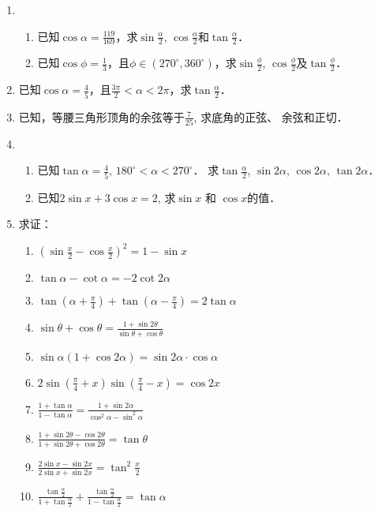 \begin{enumerate}
\item \begin{enumerate}
    \item 已知$\cos\alpha =\frac{119}{169}$，求$\sin\frac{\alpha}{2}$, $\cos\frac{\alpha}{2}$和$\tan\frac{\alpha}{2}$．
    \item 已知$\cos\phi=\frac{1}{3}$，且$\phi\in(270^{\circ}, 360^{\circ})$，求$\sin\frac{\phi}{2}$, $\cos\frac{\phi}{2}$及$\tan\frac{\phi}{2}$．
\end{enumerate}
\item 已知$\cos\alpha=\frac{4}{5}$，且$\frac{3\pi}{2}<\alpha<2\pi$，求$\tan\frac{\alpha}{2}$．
\item 已知，等腰三角形顶角的余弦等于$\frac{7}{25}$, 求底角的正弦、
余弦和正切．
\item \begin{enumerate}
    \item 已知$\tan\alpha=\frac{4}{5}$, $180^{\circ}<\alpha<270^{\circ}$．
求$\tan\frac{\alpha}{2}$, $\sin2\alpha$, $\cos2\alpha$, $\tan 2\alpha$．
\item 已知$2\sin x+3\cos x=2$, 
求$\sin x$ 和 $\cos x$的值．
\end{enumerate}

\item 求证：
\begin{enumerate}
    \item $\left(\sin\frac{x}{2}-\cos\frac{x}{2}\right)^2=1-\sin x$
    \item $\tan\alpha-\cot\alpha=-2\cot 2\alpha$
    \item $\tan\left(\alpha+\frac{\pi}{4}\right)+\tan\left(\alpha-\frac{\pi}{4}\right)=2\tan\alpha$
    \item $\sin\theta+\cos\theta=\frac{1+\sin2\theta}{\sin\theta+\cos\theta}$
    \item $\sin\alpha(1+\cos2\alpha)=\sin2\alpha\cdot \cos\alpha$
    \item $2\sin\left(\frac{\pi}{4}+x\right)\sin\left(\frac{\pi}{4}-x\right)=\cos2x$
    \item $\frac{1+\tan\alpha}{1-\tan\alpha}=\frac{1+\sin2\alpha}{\cos^2\alpha-\sin^2\alpha}$
    \item $\frac{1+\sin2\theta-\cos2\theta}{1+\sin2\theta+\cos2\theta}=\tan\theta$
    \item $\frac{2\sin x-\sin2x}{2\sin x+\sin2x}=\tan^2\frac{x}{2}$
    \item $\frac{\tan\frac{\alpha}{2}}{1+\tan\frac{\alpha}{2}}+\frac{\tan\frac{\alpha}{2}}{1-\tan\frac{\alpha}{2}}=\tan\alpha$
\end{enumerate}


\end{enumerate}
